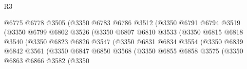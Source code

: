 \begin{lexlean}{R3}
\begin{coremodule}
                                      @6775
                                      @6778
                                      @3505
                                      (@3350
                                        @6783
                                        @6786
                                        @3512
                                        (@3350
                                          @6791
                                          @6794
                                          @3519
                                          (@3350
                                            @6799
                                            @6802
                                            @3526
                                            (@3350
                                              @6807
                                              @6810
                                              @3533
                                              (@3350
                                                @6815
                                                @6818
                                                @3540
                                                (@3350
                                                  @6823
                                                  @6826
                                                  @3547
                                                  (@3350
                                                    @6831
                                                    @6834
                                                    @3554
                                                    (@3350
                                                      @6839
                                                      @6842
                                                      @3561
                                                      (@3350
                                                        @6847
                                                        @6850
                                                        @3568
                                                        (@3350
                                                          @6855
                                                          @6858
                                                          @3575
                                                          (@3350
                                                            @6863
                                                            @6866
                                                            @3582
                                                            (@3350

\end{coremodule}
\end{lexlean}

